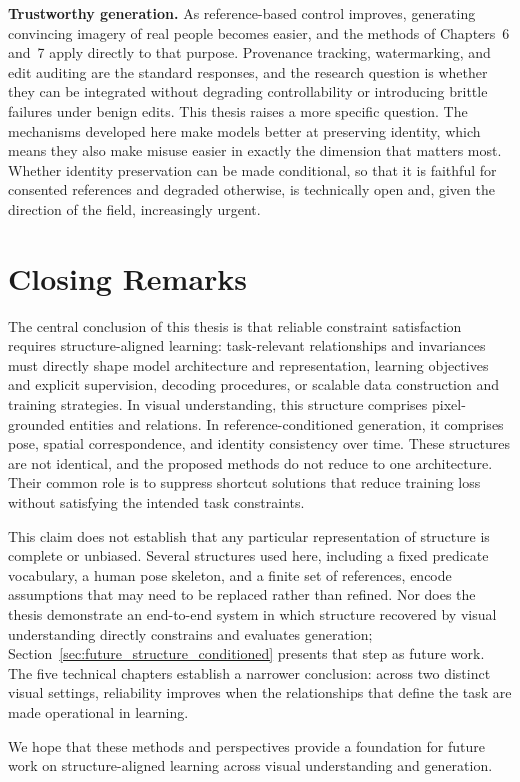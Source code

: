 \noindent \textbf{Trustworthy generation.}
As reference-based control improves, generating convincing imagery of real people becomes easier, and the methods of Chapters~6 and~7 apply directly to that purpose. Provenance tracking, watermarking, and edit auditing are the standard responses, and the research question is whether they can be integrated without degrading controllability or introducing brittle failures under benign edits. This thesis raises a more specific question. The mechanisms developed here make models better at preserving identity, which means they also make misuse easier in exactly the dimension that matters most. Whether identity preservation can be made conditional, so that it is faithful for consented references and degraded otherwise, is technically open and, given the direction of the field, increasingly urgent.

\section{Closing Remarks}
The central conclusion of this thesis is that reliable constraint satisfaction requires structure-aligned learning: task-relevant relationships and invariances must directly shape model architecture and representation, learning objectives and explicit supervision, decoding procedures, or scalable data construction and training strategies. In visual understanding, this structure comprises pixel-grounded entities and relations. In reference-conditioned generation, it comprises pose, spatial correspondence, and identity consistency over time. These structures are not identical, and the proposed methods do not reduce to one architecture. Their common role is to suppress shortcut solutions that reduce training loss without satisfying the intended task constraints.

This claim does not establish that any particular representation of structure is complete or unbiased. Several structures used here, including a fixed predicate vocabulary, a human pose skeleton, and a finite set of references, encode assumptions that may need to be replaced rather than refined. Nor does the thesis demonstrate an end-to-end system in which structure recovered by visual understanding directly constrains and evaluates generation; Section~\ref{sec:future_structure_conditioned} presents that step as future work. The five technical chapters establish a narrower conclusion: across two distinct visual settings, reliability improves when the relationships that define the task are made operational in learning.

We hope that these methods and perspectives provide a foundation for future work on structure-aligned learning across visual understanding and generation.
